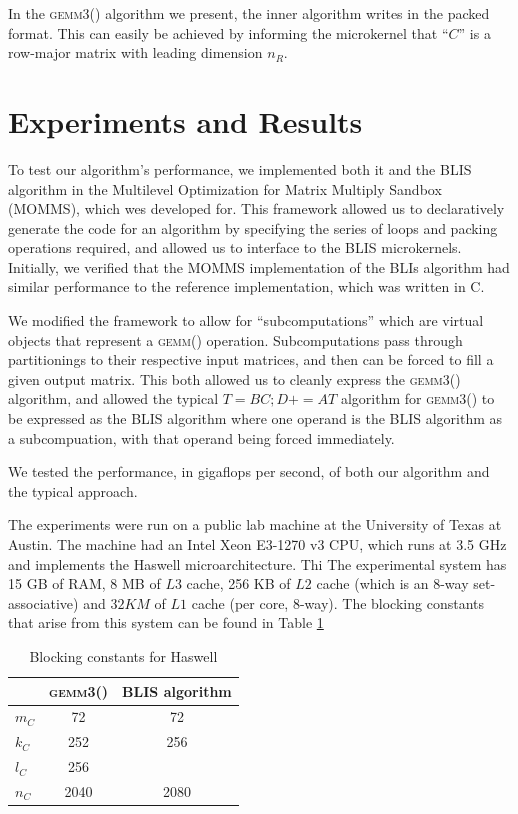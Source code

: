 \documentclass[12pt]{article}
\newcommand*{\pluseq}{\mathrel{{+}{=}}}
\newcommand*{\gemmt}{{\textsc{gemm3()}}}
\newcommand*{\gemm}{{\textsc{gemm()}}}
\begin{document}
In the \gemmt{} algorithm we present, the inner algorithm writes in the packed format.
This can easily be achieved by informing the microkernel that ``$C$'' is a row-major matrix with leading dimension $n_R$.

\section{Experiments and Results}
To test our algorithm's performance, we implemented both it and the BLIS algorithm in the Multilevel Optimization for Matrix Multiply Sandbox (MOMMS), which wes developed for\cite{SmithDiss2017}.
This framework allowed us to declaratively generate the code for an algorithm by specifying the series of loops and packing operations required, and allowed us to interface to the BLIS microkernels.
Initially, we verified that the MOMMS implementation of the BLIs algorithm had similar performance to the reference implementation, which was written in C.

We modified the framework to allow for ``subcomputations'' which are virtual objects that represent a \gemm{} operation.
Subcomputations pass through partitionings to their respective input matrices, and then can be forced to fill a given output matrix.
This both allowed us to cleanly express the \gemmt{} algorithm, and allowed the typical $T = BC; D \pluseq AT$ algorithm for \gemmt{} to be expressed as the BLIS algorithm where one operand is the BLIS algorithm as a subcompuation, with that operand being forced immediately.

We tested the performance, in gigaflops per second, of both our algorithm and the typical approach.

The experiments were run on a public lab machine at the University of Texas at Austin.
The machine had an Intel Xeon E3-1270 v3 CPU, which runs at 3.5 GHz and implements the Haswell microarchitecture.
Thi
The experimental system has 15 GB of RAM, 8 MB of $L3$ cache, 256 KB of $L2$ cache (which is an 8-way set-associative) and $32 KM$ of $L1$ cache (per core, 8-way).
The blocking constants that arise from this system can be found in Table \ref{tab:constants}

\begin{table}
  \centering
  \begin{tabular}{l|c c}
    &\gemmt{}&BLIS algorithm\\ \hline
    $m_C$&72&72\\
    $k_C$&252&256\\
    $l_C$&256&\\
    $n_C$&2040&2080\\
  \end{tabular}
  \caption{Blocking constants for Haswell}
  \label{tab:constants}
\end{table}
\end{document}
